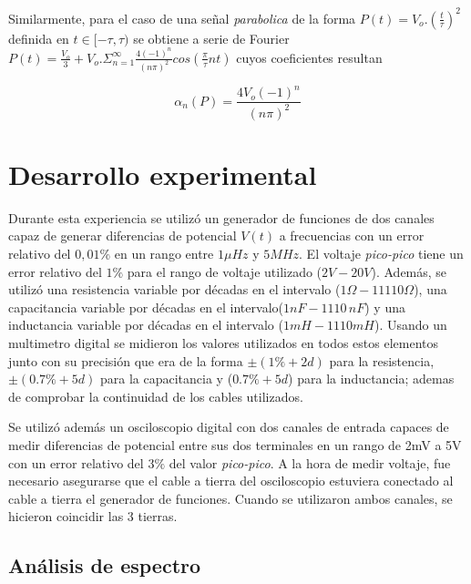 \documentclass[11pt,a4paper]{article}
\begin{document}
Similarmente, para el caso de una señal \textit{parabolica} de la forma $P(t)=V_o.(\frac{t}{\tau})^2$ definida en $t\in[-\tau,\tau)$ se obtiene a serie de Fourier $P(t) = \frac{V_o}{3} + V_o.\Sigma_{n=1}^{\infty} \frac{4(-1)^n}{(n\pi)^2}cos(\frac{\pi}{\tau}nt)$ cuyos coeficientes resultan

\begin{equation}
\alpha_n(P) = \frac{4V_o(-1)^n}{(n\pi)^2}
\label{eq:coef_parab}
\end{equation}


\section{Desarrollo experimental}
Durante esta experiencia se utilizó un generador de funciones de dos canales capaz de generar diferencias de potencial $V(t)$ a frecuencias con un error relativo del $0,01\%$ en un rango entre $1\mu Hz$ y $5MHz$. El voltaje \textit{pico-pico} tiene un error relativo del $1\%$ para el rango de voltaje utilizado ($2V-20V$). Además, se utilizó una resistencia variable por décadas en el intervalo ($1\Omega-11110\Omega$), una capacitancia variable por décadas en el intervalo($1nF-1110\,nF$) y una inductancia variable por décadas en el intervalo ($1mH-1110mH$). Usando un multimetro digital se midieron los valores utilizados en todos estos elementos junto con su precisión que era de la forma $\pm(1\%+2d)$ para la resistencia, $\pm(0.7\%+5d)$ para la capacitancia y ($0.7\% +5d$) para la inductancia; ademas de comprobar la continuidad de los cables utilizados.

Se utilizó además un osciloscopio digital con dos canales de entrada capaces de medir diferencias de potencial entre sus dos terminales en un rango de 2mV a 5V con un error relativo del $3\%$ del valor \textit{pico-pico}. A la hora de medir voltaje, fue necesario asegurarse que el cable a tierra del osciloscopio estuviera conectado al cable a tierra el generador de funciones. Cuando se utilizaron ambos canales, se hicieron coincidir las 3 tierras.

\subsection{Análisis de espectro}
\end{document}
